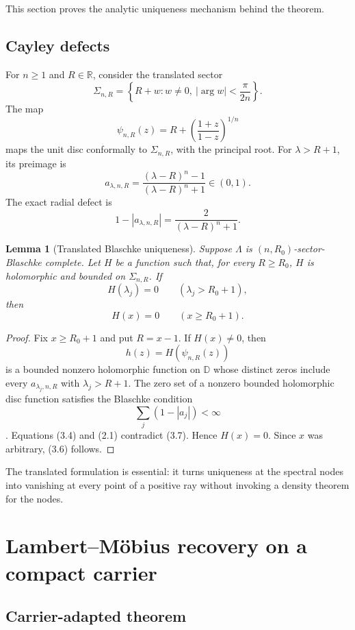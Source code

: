 \documentclass[11pt]{article}
\newtheorem{lemma}[theorem]{Lemma}
\newcommand{\R}{\mathbb R}
\newcommand{\D}{\mathbb D}
\begin{document}
This section proves the analytic uniqueness mechanism behind the theorem.

\subsection{Cayley defects}

For \(n\geq1\) and \(R\in\R\), consider the translated sector
\[
 \Sigma_{n,R}
  =\left\{R+w:w\neq0,\ |\arg w|<\frac{\pi}{2n}\right\}.
 \tag{3.1}
\]
The map
\[
 \psi_{n,R}(z)
 =R+\left(\frac{1+z}{1-z}\right)^{1/n}
 \tag{3.2}
\]
maps the unit disc conformally to \(\Sigma_{n,R}\), with the principal root.
For \(\lambda>R+1\), its preimage is
\[
 a_{\lambda,n,R}
 =\frac{(\lambda-R)^n-1}{(\lambda-R)^n+1}\in(0,1).
 \tag{3.3}
\]
The exact radial defect is
\[
 1-|a_{\lambda,n,R}|
 =\frac{2}{(\lambda-R)^n+1}.
 \tag{3.4}
\]

\begin{lemma}[Translated Blaschke uniqueness]\label{lem:blaschke}
Suppose \(\Lambda\) is \((n,R_0)\)-sector-Blaschke complete.  Let \(H\) be a
function such that, for every \(R\geq R_0\), \(H\) is holomorphic and bounded on
\(\Sigma_{n,R}\).  If
\[
 H(\lambda_j)=0\qquad(\lambda_j>R_0+1),
 \tag{3.5}
\]
then
\[
 H(x)=0\qquad(x\geq R_0+1).
 \tag{3.6}
\]
\end{lemma}

\begin{proof}
Fix \(x\geq R_0+1\) and put \(R=x-1\).  If \(H(x)\neq0\), then
\[
 h(z)=H(\psi_{n,R}(z))
\]
is a bounded nonzero holomorphic function on \(\D\) whose distinct zeros include
every \(a_{\lambda_j,n,R}\) with \(\lambda_j>R+1\).  The zero set of a nonzero
bounded holomorphic disc function satisfies the Blaschke condition
\[
 \sum_j(1-|a_j|)<\infty
 \tag{3.7}
\]
\cite[Chapter II]{Garnett2007}.  Equations (3.4) and (2.1) contradict
\textup{(3.7)}.  Hence \(H(x)=0\).  Since \(x\) was arbitrary, (3.6) follows.
\end{proof}

The translated formulation is essential: it turns uniqueness at the spectral nodes
into vanishing at every point of a positive ray without invoking a density theorem
for the nodes.

\section{Lambert--M\"obius recovery on a compact carrier}

\subsection{Carrier-adapted theorem}
\end{document}
